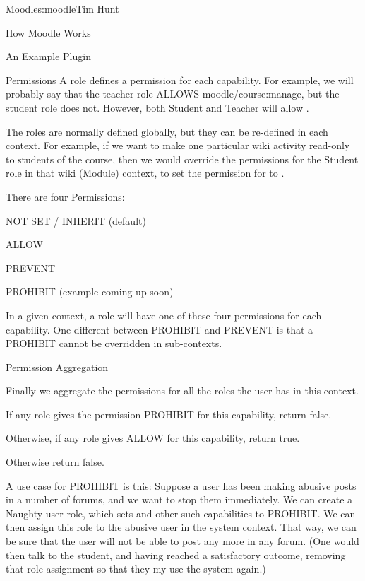 \begin{aosachapter}{Moodle}{s:moodle}{Tim Hunt}
\begin{aosasect1}{How Moodle Works}
\begin{aosasect2}{An Example Plugin}
\begin{aosasect3}{Permissions}
A role defines a permission for each capability. For example, we will
probably say that the teacher role ALLOWS moodle/course:manage, but
the student role does not. However, both Student and Teacher will
allow .

The roles are normally defined globally, but they can be re-defined in
each context. For example, if we want to make one particular wiki
activity read-only to students of the course, then we would override
the permissions for the Student role in that wiki (Module) context, to
set the permission for  to .

There are four Permissions:

\begin{aosaitemize}

\item NOT SET / INHERIT (default)

\item ALLOW

\item PREVENT

\item PROHIBIT (example coming up soon)

\end{aosaitemize}

In a given context, a role will have one of these four permissions for
each capability. One different between PROHIBIT and PREVENT is that a
PROHIBIT cannot be overridden in sub-contexts.

\end{aosasect3}

\begin{aosasect3}{Permission Aggregation}

Finally we aggregate the permissions for all the roles the user has in
this context.

\begin{aosaitemize}

\item If any role gives the permission PROHIBIT for this capability,
  return false.

\item Otherwise, if any role gives ALLOW for this capability, return
  true.

\item Otherwise return false.

\end{aosaitemize}

A use case for PROHIBIT is this: Suppose a user has been making
abusive posts in a number of forums, and we want to stop them
immediately. We can create a Naughty user role, which sets
 and other such capabilities to PROHIBIT. We can
then assign this role to the abusive user in the system context. That
way, we can be sure that the user will not be able to post any more in
any forum. (One would then talk to the student, and having reached a
satisfactory outcome, removing that role assignment so that they my
use the system again.)


\end{aosasect3}
\end{aosasect2}
\end{aosasect1}
\end{aosachapter}
